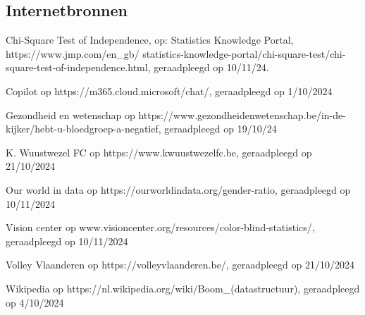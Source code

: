 \begin{bronnen}
\subsection*{Internetbronnen}
    \item Chi-Square Test of Independence, op: Statistics Knowledge Portal, https://www.jmp.com/en\_gb/ \newline statistics-knowledge-portal/chi-square-test/chi-square-test-of-independence.html, geraadpleegd op 10/11/24.
    \item Copilot op https://m365.cloud.microsoft/chat/, geraadpleegd op 1/10/2024
    \item Gezondheid en wetenschap op https://www.gezondheidenwetenschap.be/in-de-kijker/hebt-u-bloedgroep-a-negatief, geraadpleegd op 19/10/24
    \item K. Wuustwezel FC op https://www.kwuustwezelfc.be, geraadpleegd op 21/10/2024
    \item Our world in data op https://ourworldindata.org/gender-ratio, geraadpleegd op 10/11/2024
    \item Vision center op www.visioncenter.org/resources/color-blind-statistics/, geraadpleegd op 10/11/2024
    \item Volley Vlaanderen op https://volleyvlaanderen.be/, geraadpleegd op 21/10/2024
    \item Wikipedia op https://nl.wikipedia.org/wiki/Boom\_(datastructuur), geraadpleegd op 4/10/2024
\end{bronnen}